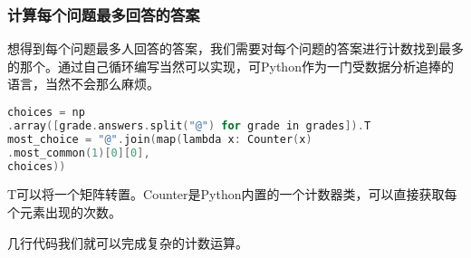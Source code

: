 \subsubsection{计算每个问题最多回答的答案}

想得到每个问题最多人回答的答案，我们需要对每个问题的答案进行计数找到最多的那个。通过自己循环编写当然可以实现，可Python作为一门受数据分析追捧的语言，当然不会那么麻烦。

\begin{lstlisting}[language=C]
choices = np
.array([grade.answers.split("@") for grade in grades]).T
most_choice = "@".join(map(lambda x: Counter(x)
.most_common(1)[0][0],
choices))
\end{lstlisting}

T可以将一个矩阵转置。Counter是Python内置的一个计数器类，可以直接获取每个元素出现的次数。

几行代码我们就可以完成复杂的计数运算。
